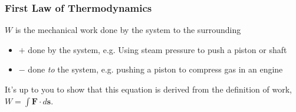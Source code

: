 \documentclass[12pt,aspectratio=169]{beamer}
\newcommand{\mb}[1]{\mathbf{#1}}
\newcommand{\eq}[2]{\vspace{#1}{\Large\begin{displaymath}#2\end{displaymath}}}
\begin{document}
\begin{frame}
  \frametitle{First Law of Thermodynamics}

  \vspace{-.1in}$W$ is the mechanical work done by the system to the surrounding
  \begin{itemize}
  \item $+$ done by the system, e.g.
    Using steam pressure to push a piston or shaft
  \item $-$ done \emph{to} the system, e.g.
    pushing a piston to compress gas in an engine
  \end{itemize}
%
%
%

  \eq{-.2in}{
    \boxed{ W=\int_{P_1}^{P_2} PdV}
  }
  
  \vspace{-.1in}It's up to you to show that this equation is derived from the
  definition of work, $W=\int\mb{F}\cdot d\mb{s}$.
\end{frame}
\end{document}
